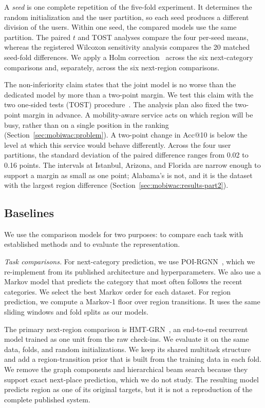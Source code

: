 A \emph{seed} is one complete repetition of the five-fold experiment. It determines the random initialization and the user partition, so each seed produces a different division of the users. Within one seed, the compared models use the same partition. The paired $t$ and TOST analyses compare the four per-seed means, whereas the registered Wilcoxon sensitivity analysis compares the 20 matched seed-fold differences. We apply a Holm correction~\cite{holm1979} across the six next-category comparisons and, separately, across the six next-region comparisons.

The non-inferiority claim states that the joint model is no worse than the dedicated model by more than a two-point margin. We test this claim with the two one-sided tests (TOST) procedure~\cite{lakens2017tost}. The analysis plan also fixed the two-point margin in advance. A mobility-aware service acts on which region will be busy, rather than on a single position in the ranking (Section~\ref{sec:mobiwac:problem}). A two-point change in Acc@10 is below the level at which this service would behave differently. Across the four user partitions, the standard deviation of the paired difference ranges from 0.02 to 0.16 points. The intervals at Istanbul, Arizona, and Florida are narrow enough to support a margin as small as one point; Alabama's is not, and it is the dataset with the largest region difference (Section~\ref{sec:mobiwac:results-part2}).

\subsection{Baselines}
\label{sec:mobiwac:setup-baselines}
We use the comparison models for two purposes: to compare each task with established methods and to evaluate the representation.

\emph{Task comparisons.} For next-category prediction, we use POI-RGNN~\cite{capanema2023poirgnn}, which we re-implement from its published architecture and hyperparameters. We also use a Markov model that predicts the category that most often follows the recent categories. We select the best Markov order for each dataset. For region prediction, we compute a Markov-1 floor over region transitions. It uses the same sliding windows and fold splits as our models.

The primary next-region comparison is HMT-GRN~\cite{Lim2022}, an end-to-end recurrent model trained as one unit from the raw check-ins. We evaluate it on the same data, folds, and random initializations. We keep its shared multitask structure and add a region-transition prior that is built from the training data in each fold. We remove the graph components and hierarchical beam search because they support exact next-place prediction, which we do not study. The resulting model predicts region as one of its original targets, but it is not a reproduction of the complete published system.

